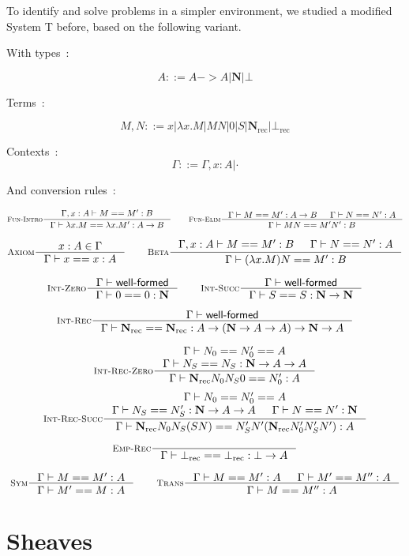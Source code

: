 \documentclass[11pt]{article}
\DeclareMathOperator{\rec}{rec}
\newcommand{\0}{\mathbf{0}}
\newcommand{\1}{\mathbf{1}}
\newcommand{\nat}{\mathbf{N}}
\newcommand{\tctx}{\Gamma}
\newcommand{\Wf}{\textsf{well-formed}}
\begin{document}
To identify and solve problems in a simpler environment, we studied a modified System T before, based on the following variant.

With types~:

$$ A ::= A -> A | \nat | \bot $$

Terms~:

$$ M,N ::= x | \lambda x. M | MN | 0 | S | \nat_{\rec} | \bot_{\rec} $$


Contexts~:
$$ \tctx ::= \tctx, x : A | \cdot $$

And conversion rules~:


$$
    \inference[\textsc{Fun-Intro}]{\tctx, x : A |- M == M' : B }{\tctx |- \lambda x. M == \lambda x. M' : A -> B} \qquad
    \inference[\textsc{Fun-Elim}]{\tctx |- M == M' : A -> B& \tctx |- N == N' : A}{\tctx |- MN == M'N' : B}
$$

$$
    \inference[\textsc{Axiom}]{x : A \in \tctx }{\tctx |- x == x : A} \qquad
    \inference[\textsc{Beta}]{\tctx, x : A |- M == M' : B & \tctx |- N == N' : A}{\tctx |- (\lambda x. M)N == M' : B}
$$

$$
    \inference[\textsc{Int-Zero}]{\tctx |- \Wf}{\tctx |- 0 == 0 : \nat} \qquad
    \inference[\textsc{Int-Succ}]{\tctx |- \Wf}{\tctx |- S == S : \nat -> \nat}
$$

$$
    \inference[\textsc{Int-Rec}]{\tctx |- \Wf}{\tctx |- \nat_{\rec} == \nat_{\rec} : A \to \left(\nat -> A -> A \right) -> \nat -> A}
$$


$$
    \inference[\textsc{Int-Rec-Zero}]{\tctx |- N_0 == N'_0 == A\\ \tctx |- N_S == N_S : \nat -> A  -> A}{\tctx |- \nat_{\rec} N_0N_S0 == N'_0 : A}
$$
$$
    \inference[\textsc{Int-Rec-Succ}]{\tctx |- N_0 == N'_0 == A\\ \tctx |- N_S == N'_S : \nat -> A  -> A & \tctx |- N == N' :\nat}{\tctx |- \nat_{\rec} N_0N_S (S N) == N'_S N' (\nat_{\rec}N'_0 N'_S N') : A}
$$


$$
    \inference[\textsc{Emp-Rec}]{}{\tctx |- \bot_{\rec} == \bot_{\rec} : \bot -> A}
$$

$$
    \inference[\textsc{Sym}]{\tctx |- M == M' : A}{\tctx |- M' == M : A} \qquad
    \inference[\textsc{Trans}]
    {\tctx |- M == M' :A & \tctx |- M' == M'' : A}{\tctx |- M == M'' : A}
$$

\section{Sheaves}\label{Sheaves}
\end{document}
